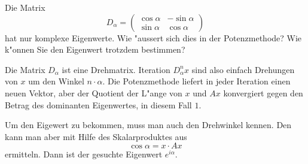 Die Matrix
\[
D_\alpha
=
\begin{pmatrix}
\cos\alpha&-\sin\alpha\\
\sin\alpha& \cos\alpha
\end{pmatrix}
\]
hat nur komplexe Eigenwerte.
Wie "aussert sich dies in der Potenzmethode?
Wie k"onnen Sie den Eigenwert trotzdem bestimmen?

\begin{loesung}
Die Matrix $D_\alpha$ ist eine Drehmatrix. 
Iteration $D_\alpha^n x$ sind also einfach Drehungen von $x$
um den Winkel $n\cdot \alpha$.
Die Potenzmethode liefert in jeder Iteration einen neuen Vektor,
aber der Quotient der L"ange von $x$ und $Ax$ konvergiert 
gegen den Betrag des dominanten Eigenwertes, in diesem Fall $1$.

Um den Eigewert zu bekommen, muss man auch den Drehwinkel kennen.
Den kann man aber mit Hilfe des Skalarproduktes aus
\[
\cos \alpha = x\cdot Ax
\]
ermitteln. Dann ist der gesuchte Eigenwert $e^{i\alpha}$.
\end{loesung}

